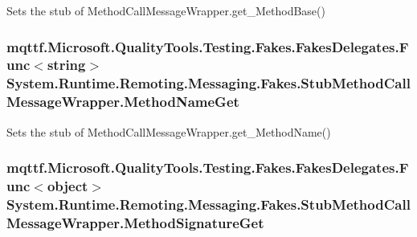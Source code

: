 Sets the stub of Method\-Call\-Message\-Wrapper.\-get\-\_\-\-Method\-Base()

\hypertarget{class_system_1_1_runtime_1_1_remoting_1_1_messaging_1_1_fakes_1_1_stub_method_call_message_wrapper_acc9d8c974ac45514b18927ba10317d5c}{
\subsubsection[{Method\-Name\-Get}]{\setlength{\rightskip}{0pt plus 5cm}mqttf.\-Microsoft.\-Quality\-Tools.\-Testing.\-Fakes.\-Fakes\-Delegates.\-Func$<$string$>$ System.\-Runtime.\-Remoting.\-Messaging.\-Fakes.\-Stub\-Method\-Call\-Message\-Wrapper.\-Method\-Name\-Get}}\label{class_system_1_1_runtime_1_1_remoting_1_1_messaging_1_1_fakes_1_1_stub_method_call_message_wrapper_acc9d8c974ac45514b18927ba10317d5c}


Sets the stub of Method\-Call\-Message\-Wrapper.\-get\-\_\-\-Method\-Name()

\hypertarget{class_system_1_1_runtime_1_1_remoting_1_1_messaging_1_1_fakes_1_1_stub_method_call_message_wrapper_a905ea4c225b5828913045813f6ba12b3}{
\subsubsection[{Method\-Signature\-Get}]{\setlength{\rightskip}{0pt plus 5cm}mqttf.\-Microsoft.\-Quality\-Tools.\-Testing.\-Fakes.\-Fakes\-Delegates.\-Func$<$object$>$ System.\-Runtime.\-Remoting.\-Messaging.\-Fakes.\-Stub\-Method\-Call\-Message\-Wrapper.\-Method\-Signature\-Get}}\label{class_system_1_1_runtime_1_1_remoting_1_1_messaging_1_1_fakes_1_1_stub_method_call_message_wrapper_a905ea4c225b5828913045813f6ba12b3}


